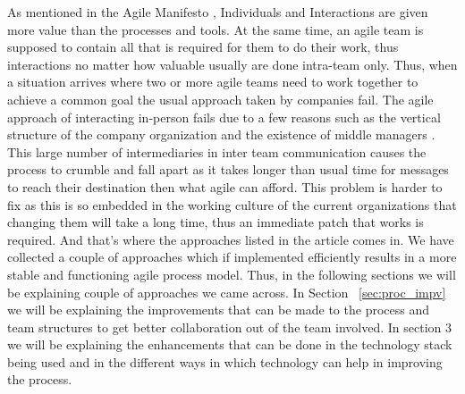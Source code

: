 As mentioned in the Agile Manifesto \cite{beck2001agile}, Individuals and Interactions are given more value than the processes and tools. At the same time, an agile team is supposed to contain all that is required for them to do their work, thus interactions no matter how valuable usually are done intra-team only. Thus, when a situation arrives where two or more agile teams need to work together to achieve a common goal the usual approach taken by companies fail. The agile approach of interacting in-person fails due to a few reasons such as the vertical structure of the company organization and the existence of middle managers \cite{dzone_article}. This large number of intermediaries in inter team communication causes the process to crumble and fall apart as it takes longer than usual time for messages to reach their destination then what agile can afford.
This problem is harder to fix as this is so embedded in the working culture of the current organizations that changing them will take a long time, thus an immediate patch that works is required. And that’s where the approaches listed in the article comes in. We have collected a couple of approaches which if implemented efficiently results in a more stable and functioning agile process model. Thus, in the following sections we will be explaining couple of approaches we came across.
\linebreak
In Section ~\ref{sec:proc_impv} we will be explaining the improvements that can be made to the process and team structures to get better collaboration out of the team involved.
\linebreak
In section 3 we will be explaining the enhancements that can be done in the technology stack being used and in the different ways in which technology can help in improving the process.

